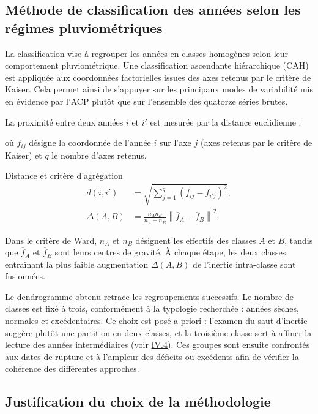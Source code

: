 \documentclass[12pt,a4paper]{report}
\begin{document}
\subsection{Méthode de classification des années selon les régimes pluviométriques}

La classification vise à regrouper les années en classes homogènes selon leur comportement pluviométrique. Une classification ascendante hiérarchique (CAH) est appliquée aux coordonnées factorielles issues des axes retenus par le critère de Kaiser. Cela permet ainsi de s'appuyer sur les principaux modes de variabilité mis en évidence par l'ACP plutôt que sur l'ensemble des quatorze séries brutes.

La proximité entre deux années $i$ et $i'$ est mesurée par la distance euclidienne :

où $f_{ij}$ désigne la coordonnée de l'année $i$ sur l'axe $j$ (axes retenus par le critère de Kaiser) et $q$ le nombre d'axes retenus.

\begin{formulabox}{Distance et critère d'agrégation}
\begin{align}
d(i,i')&=\sqrt{\sum_{j=1}^{q}\left(f_{ij}-f_{i'j}\right)^2},
\label{eq:distance-euclidienne}\\[1mm]
\Delta(A,B)&=\frac{n_A n_B}{n_A+n_B}
\left\|\overline{f}_A-\overline{f}_B\right\|^2.
\label{eq:ward}
\end{align}
\end{formulabox}

Dans le critère de Ward, $n_A$ et $n_B$ désignent les effectifs des classes $A$ et $B$, tandis que $\overline{f}_A$ et $\overline{f}_B$ sont leurs centres de gravité. À chaque étape, les deux classes entraînant la plus faible augmentation $\Delta(A,B)$ de l'inertie intra-classe sont fusionnées.

Le dendrogramme obtenu retrace les regroupements successifs. Le nombre de classes est fixé à trois, conformément à la typologie recherchée : années sèches, normales et excédentaires. Ce choix est posé a priori : l’examen du saut d’inertie suggère plutôt une partition en deux classes, et la troisième classe sert à affiner la lecture des années intermédiaires (voir \hyperref[sec:classification-annees]{IV.4}). Ces groupes sont ensuite confrontés aux dates de rupture et à l’ampleur des déficits ou excédents afin de vérifier la cohérence des différentes approches.


\subsection{Justification du choix de la méthodologie}
\end{document}
